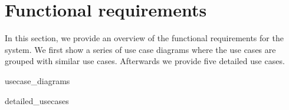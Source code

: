\section{Functional requirements}
In this section, we provide an overview of the functional requirements for the system. We first show a series of use case diagrams where the use cases are grouped with similar use cases. Afterwards we provide five detailed use cases.

{usecase_diagrams}

{detailed_usecases}
